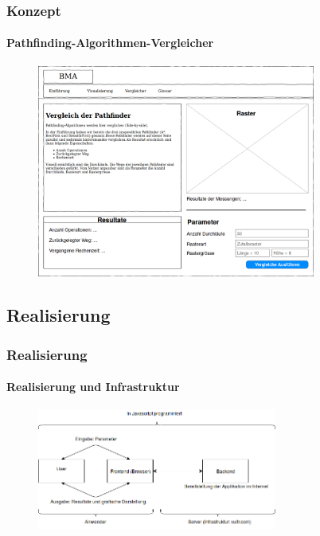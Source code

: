 \documentclass[professionalfont,serif,german]{beamer}
\begin{document}
\begin{frame}
  \frametitle{Konzept}
  \framesubtitle{Pathfinding-Algorithmen-Vergleicher}
  \begin{figure}
    \includegraphics[height=7cm]{img/konzept1.png}
  \end{figure}
\end{frame}


\begin{frame}
  \section{Realisierung}
  \frametitle{Realisierung}
  \framesubtitle{Realisierung und Infrastruktur}
  \begin{figure}
    \includegraphics[height=4cm]{img/diagram1.png}
  \end{figure}
\end{frame}
\end{document}
